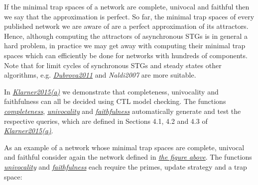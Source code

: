 \documentclass[letterpaper,10pt,english]{sphinxmanual}
\begin{document}
If the minimal trap spaces of a network are complete, univocal and faithful then we say that the approximation is perfect.
So far, the minimal trap spaces of every published network we are aware of are a perfect approximation of its attractors.
Hence, although computing the attractors of asynchronous STGs is in general a hard problem,
in practice we may get away with computing their minimal trap spaces which can efficiently be done for networks with hundreds of components.
Note that for limit cycles of synchronous STGs and steady states other algorithms, e.g. {\hyperref[Bibliography:dubrova2011]{\emph{Dubrova2011}}} and \emph{Naldi2007} are more suitable.

In {\hyperref[Bibliography:klarner2015trap]{\emph{Klarner2015(a)}}} we demonstrate that completeness, univocality and faithfulness can all be decided using CTL model checking.
The functions {\hyperref[AttractorDetection:completeness]{\emph{completeness}}}, {\hyperref[AttractorDetection:univocality]{\emph{univocality}}} and {\hyperref[AttractorDetection:faithfulness]{\emph{faithfulness}}} automatically generate and test the respective queries,
which are defined in Sections 4.1, 4.2 and 4.3 of {\hyperref[Bibliography:klarner2015trap]{\emph{Klarner2015(a)}}}.

As an example of a network whose minimal trap spaces are complete, univocal and faithful
consider again the network defined in {\hyperref[Manual:figure25]{\emph{the figure above}}}.
The functions {\hyperref[AttractorDetection:univocality]{\emph{univocality}}} and {\hyperref[AttractorDetection:faithfulness]{\emph{faithfulness}}} each require the primes, update strategy and a trap space:
\end{document}
